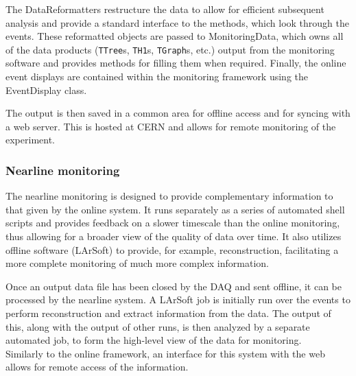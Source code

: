 The DataReformatters restructure the data to allow for efficient subsequent
analysis and provide a standard interface to the methods, which look through
the events.  These reformatted objects are passed to MonitoringData, which
owns all of the data products (\texttt{TTree}s, \texttt{TH1}s, \texttt{TGraph}s,
etc.) output from the monitoring software and provides methods for filling
them when required.  Finally, the online event displays are
contained within the monitoring framework using the EventDisplay class.

The output is then saved in a common area for offline access and for syncing
with a web server. This is hosted at CERN and allows for remote
monitoring of the experiment.

\subsubsection{Nearline monitoring}

The nearline monitoring is designed to provide complementary information to
that given by the online system. It runs separately as a series of automated
shell scripts and provides feedback on a slower timescale than the online
monitoring, thus allowing for a broader view of the quality of data over time.
It also utilizes offline software (LArSoft) to provide, for example,
reconstruction, facilitating a more complete monitoring of much more complex
information.

Once an output data file has been closed by the DAQ and sent offline, it can be processed by the
nearline system.  A LArSoft job is initially run over the events to perform
reconstruction and extract information from the data.  The output of this,
along with the output of other runs, is then analyzed by a separate automated
job, to form the high-level view of the data for monitoring.\\
%
Similarly to the online framework, %
an interface for this system
with the web allows for remote access of the information.


